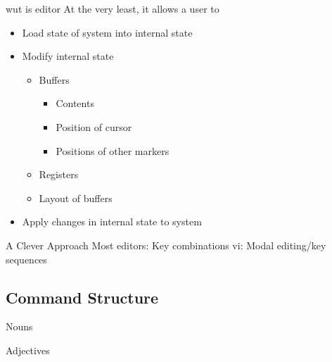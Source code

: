 \documentclass{beamer}
\begin{document}
            \begin{frame}{wut is editor}
                \pause
                At the very least, it allows a user to
                \begin{itemize}
                    \pause
                    \item Load state of system into internal state
                    \pause
                    \item Modify internal state
                    \begin{itemize}
                        \pause
                        \item Buffers
                        \pause
                        \begin{itemize}
                            \item Contents
                            \item Position of cursor
                            \item Positions of other markers
                        \end{itemize}
                        \pause
                        \item Registers
                        \pause
                        \item Layout of buffers
                    \end{itemize}
                    \pause
                    \item Apply changes in internal state to system
                \end{itemize}
            \end{frame}

            \begin{frame}{A Clever Approach}
                Most editors: Key combinations
                \pause
                vi: Modal editing/key sequences
            \end{frame}

        \subsection{Command Structure}

            \begin{frame}{Nouns}
            \end{frame}

            \begin{frame}{Adjectives}
            \pause
            \end{frame}
\end{document}
